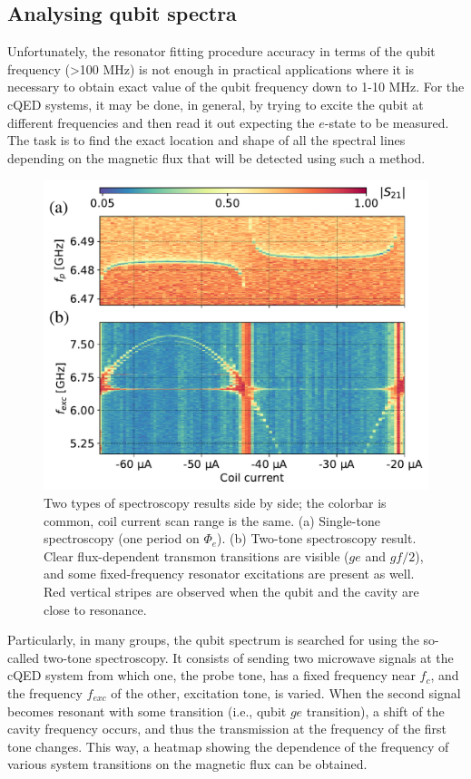 \documentclass[%
 aip,
 amsmath,amssymb,
 reprint,%
]{revtex4-1}
\begin{document}
\subsection{Analysing qubit spectra}


Unfortunately, the resonator fitting procedure accuracy in terms of the qubit frequency (>100 MHz) is not enough in practical applications where it is necessary to obtain exact value of the qubit frequency down to 1-10 MHz. For the cQED systems, it may be done, in general, by trying to excite the qubit at different frequencies and then read it out expecting the $e$-state to be measured. The task is to find the exact location and shape of all the spectral lines depending on the magnetic flux that will be detected using such a method. 

\begin{figure}[b]
	\centering
	\includegraphics[width=\linewidth]{twotone}
	\caption{Two types of spectroscopy results side by side; the colorbar is common, coil current scan range is the same. (a) Single-tone spectroscopy (one period on $\Phi_{e}$). (b) Two-tone spectroscopy result. Clear flux-dependent transmon transitions are visible ($ge$ and $gf/2$), and some fixed-frequency resonator excitations are present as well. Red vertical stripes are observed when the qubit and the cavity are close to resonance.}
	\label{fig:twotone}
\end{figure}


Particularly, in many groups, the qubit spectrum is searched for using the so-called two-tone spectroscopy\cite{wallraff2007}. It consists of sending two microwave signals at the cQED system from which one, the probe tone, has a fixed frequency near $f_c$, and the frequency $f_{exc}$ of the other, excitation tone,  is varied. When the second signal becomes resonant with some transition (i.e., qubit $ge$ transition), a shift of the cavity frequency occurs, and thus the transmission at the frequency of the first tone changes. This way, a heatmap showing the dependence of the frequency of various system transitions on the magnetic flux can be obtained. 
\end{document}
